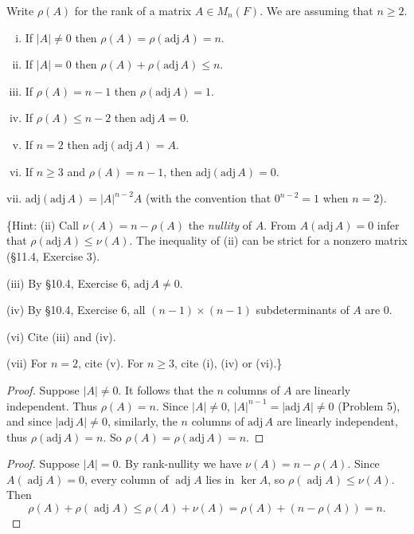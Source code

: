 \begin{tcolorbox}[title=Problem 6, breakable]
Write $\rho(A)$ for the rank of a matrix $A \in M_n(F)$. We are assuming that $n \geq 2$.
\begin{enumerate}[(i)]
    \item If $|A| \neq 0$ then $\rho(A) = \rho(\text{adj}\, A) = n$.
    \item If $|A| = 0$ then $\rho(A) + \rho(\text{adj}\, A) \leq n$.
    \item If $\rho(A) = n - 1$ then $\rho(\text{adj}\, A) = 1$.
    \item If $\rho(A) \leq n - 2$ then $\text{adj}\, A = 0$.
    \item If $n = 2$ then $\text{adj}(\text{adj}\, A) = A$.
    \item If $n \geq 3$ and $\rho(A) = n - 1$, then $\text{adj}(\text{adj}\, A) = 0$.
    \item $\text{adj}(\text{adj}\, A) = |A|^{n-2}A$ (with the convention that $0^{n-2} = 1$ when $n = 2$).
\end{enumerate}

\{Hint: (ii) Call $\nu(A) = n - \rho(A)$ the \emph{nullity} of $A$. From $A(\text{adj}\, A) = 0$ infer that $\rho(\text{adj}\, A) \leq \nu(A)$. The inequality of (ii) can be strict for a nonzero matrix (\S11.4, Exercise 3).

(iii) By \S10.4, Exercise 6, $\text{adj}\, A \neq 0$.

(iv) By \S10.4, Exercise 6, all $(n-1) \times (n-1)$ subdeterminants of $A$ are $0$.

(vi) Cite (iii) and (iv).

(vii) For $n = 2$, cite (v). For $n \geq 3$, cite (i), (iv) or (vi).\}
\end{tcolorbox}

\begin{proof}
    Suppose $|A| \ne 0$.
    It follows that the $n$ columns of $A$ are linearly independent.
    Thus $\rho(A) = n$.
    Since $|A| \ne 0$, $|A|^{n - 1} = |\text{adj}\, A| \ne 0$ (Problem 5), and since $|\text{adj}\, A| \ne 0$,
        similarly, the $n$ columns of $\text{adj}\, A$ are linearly independent,
        thus $\rho(\text{adj}\, A) = n$.
    So $\rho(A) = \rho(\text{adj}\, A) = n$.
\end{proof}

\begin{proof}
    Suppose $|A| = 0$.
    By rank-nullity we have $\nu(A) = n - \rho(A)$.
    Since $A(\operatorname{adj} A) = 0$, every column of $\operatorname{adj} A$ lies in $\ker A$,
    so $\rho(\operatorname{adj} A) \le \nu(A)$.
    Then
    \[
    \rho(A) + \rho(\operatorname{adj} A) \le \rho(A) + \nu(A) = \rho(A) + (n - \rho(A)) = n.
    \]
\end{proof}

